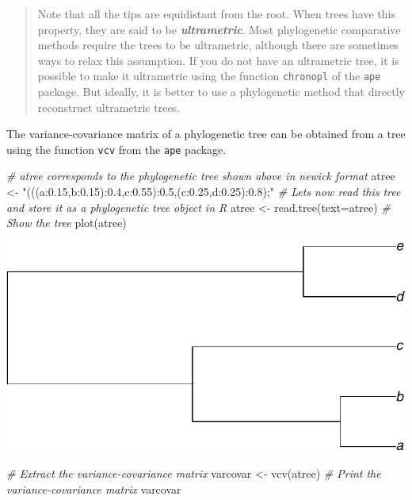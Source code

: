 \documentclass[
]{book}
\newenvironment{Shaded}{\begin{snugshade}}{\end{snugshade}}
\newcommand{\AttributeTok}[1]{\textcolor[rgb]{0.77,0.63,0.00}{#1}}
\newcommand{\CommentTok}[1]{\textcolor[rgb]{0.56,0.35,0.01}{\textit{#1}}}
\newcommand{\FunctionTok}[1]{\textcolor[rgb]{0.00,0.00,0.00}{#1}}
\newcommand{\NormalTok}[1]{#1}
\newcommand{\OtherTok}[1]{\textcolor[rgb]{0.56,0.35,0.01}{#1}}
\newcommand{\StringTok}[1]{\textcolor[rgb]{0.31,0.60,0.02}{#1}}
\begin{document}
\begin{quote}
Note that all the tips are equidistant from the root. When trees have this property, they are said to be \textbf{\emph{ultrametric}}. Most phylogenetic comparative methods require the trees to be ultrametric, although there are sometimes ways to relax this assumption. If you do not have an ultrametric tree, it is possible to make it ultrametric using the function \texttt{chronopl} of the \texttt{ape} package. But ideally, it is better to use a phylogenetic method that directly reconstruct ultrametric trees.
\end{quote}

The variance-covariance matrix of a phylogenetic tree can be obtained from a tree using the function \texttt{vcv} from the \texttt{ape} package.

\begin{Shaded}
\begin{Highlighting}[]
\CommentTok{\# \textquotesingle{}atree\textquotesingle{} corresponds to the phylogenetic tree shown above in newick format}
\NormalTok{atree }\OtherTok{\textless{}{-}} \StringTok{"(((a:0.15,b:0.15):0.4,c:0.55):0.5,(c:0.25,d:0.25):0.8);"}
\CommentTok{\# Let\textquotesingle{}s now read this tree and store it as a phylogenetic tree object in R}
\NormalTok{atree }\OtherTok{\textless{}{-}} \FunctionTok{read.tree}\NormalTok{(}\AttributeTok{text=}\NormalTok{atree)}
\CommentTok{\# Show the tree}
\FunctionTok{plot}\NormalTok{(atree)}
\end{Highlighting}
\end{Shaded}

\includegraphics{pcm-workshop_files/figure-latex/vcv function-1.pdf}

\begin{Shaded}
\begin{Highlighting}[]
\CommentTok{\# Extract the variance{-}covariance matrix}
\NormalTok{varcovar }\OtherTok{\textless{}{-}} \FunctionTok{vcv}\NormalTok{(atree)}
\CommentTok{\# Print the variance{-}covariance matrix}
\NormalTok{varcovar}
\end{Highlighting}
\end{Shaded}
\end{document}
